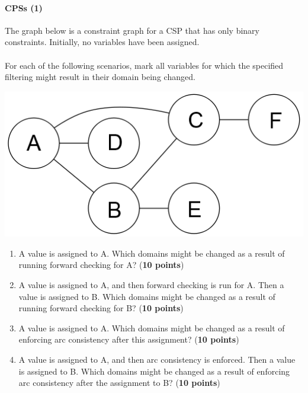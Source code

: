 \paragraph{CPSs (1)}

The graph below is a constraint graph for a CSP that has only binary constraints. Initially, no variables have been assigned.
\\\\
For each of the following scenarios, mark all variables for which the specified filtering might result in their domain being changed. 

\begin{center}
    \includegraphics[scale=.43]{figures/domainFiltering.png}
\end{center}



\begin{enumerate}

\item A value is assigned to A. Which domains might be changed as a result of running forward checking for A? (\textbf{10 points})

\vspace{2cm}

\item A value is assigned to A, and then forward checking is run for A. Then a value is assigned to B. Which domains might be changed as a result of running forward checking for B? (\textbf{10 points})

\vspace{2cm}


\item A value is assigned to A. Which domains might be changed as a result of enforcing arc consistency after this assignment? (\textbf{10 points})

\vspace{2cm}


\item A value is assigned to A, and then arc consistency is enforced. Then a value is assigned to B. Which domains might be changed as a result of enforcing arc consistency after the assignment to B? (\textbf{10 points})

\vspace{2cm}


\end{enumerate}

